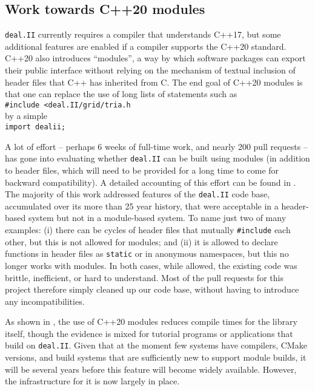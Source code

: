\documentclass{ansarticle-preprint}
\newcommand{\specialword}[1]{\texttt{#1}}
\newcommand{\dealii}{{\specialword{deal.II}}\xspace}
\begin{document}
\subsection{Work towards C++20 modules}
\label{subsec:modules}

\dealii{} currently requires a compiler that understands C++17, but
some additional features are enabled if a compiler supports the C++20
standard. C++20 also introduces ``modules'', a way by which software
packages can export their public interface without relying on the
mechanism of textual inclusion of header files that C++ has inherited from C. The
end goal of C++20 modules is that one can replace the use of long
lists of statements such as\\
\hspace*{1cm}\texttt{\#include <deal.II/grid/tria.h}\\
by a simple\\
\hspace*{1cm}\texttt{import dealii;}

A lot of effort -- perhaps 6 weeks of full-time work, and nearly 200
pull requests -- has gone into evaluating whether \dealii{} can be
built using modules (in addition to header files, which will need to
be provided for a long time to come for backward compatibility). A
detailed accounting of this effort can be found in
\cite{bangerth2025experienceconvertinglargemathematical}. The majority
of this work addressed features of the \dealii{} code base,
accumulated over its more than 25 year history, that were acceptable
in a header-based system but not in a module-based system. To name
just two of many examples: (i) there can be cycles of header files that mutually
\texttt{\#include} each other, but this is not allowed for
modules; and (ii) it is allowed to declare functions in header files
as \texttt{static} or in anonymous namespaces, but this no longer
works with modules. In both cases, while allowed, the existing code
was brittle, inefficient, or hard to understand. Most of the pull requests for this project therefore simply
cleaned up our code base, without having to introduce any
incompatibilities.

As shown in \cite{bangerth2025experienceconvertinglargemathematical},
the use of C++20 modules
reduces compile times for the library itself, though the evidence is
mixed for tutorial programs or applications that build on
\dealii{}. Given that at the moment few systems have compilers, CMake
versions, and build systems that are sufficiently new to support
module builds, it will be several years before this feature will
become widely available. However, the infrastructure for it is now
largely in place.
\end{document}
